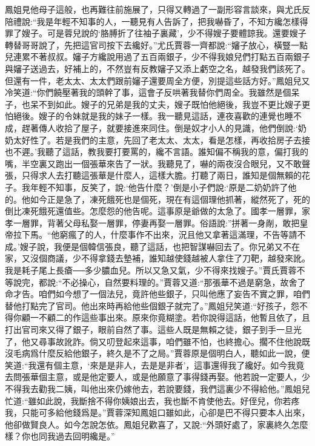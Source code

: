 \begin{parag}
    鳳姐見他母子這般，也再難往前施展了，只得又轉過了一副形容言談來，與尤氏反陪禮說:“我是年輕不知事的人，一聽見有人告訴了，把我嚇昏了，不知方纔怎樣得罪了嫂子。可是蓉兒說的‘胳膊折了往袖子裏藏’，少不得嫂子要體諒我。還要嫂子轉替哥哥說了，先把這官司按下去纔好。”尤氏賈蓉一齊都說:“嬸子放心，橫豎一點兒連累不著叔叔。嬸子方纔說用過了五百兩銀子，少不得我娘兒們打點五百兩銀子與嬸子送過去，好補上的，不然豈有反教嬸子又添上虧空之名，越發我們該死了。但還有一件，老太太、太太們跟前嬸子還要周全方便，別提這些話方好。”鳳姐兒又冷笑道:“你們饒壓著我的頭幹了事，這會子反哄著我替你們周全。我雖然是個呆子，也呆不到如此。嫂子的兄弟是我的丈夫，嫂子既怕他絕後，我豈不更比嫂子更怕絕後。嫂子的令妹就是我的妹子一樣。我一聽見這話，連夜喜歡的連覺也睡不成，趕著傳人收拾了屋子，就要接進來同住。倒是奴才小人的見識，他們倒說:‘奶奶太好性了。若是我們的主意，先回了老太太、太太，看是怎樣，再收拾房子去接也不遲。’我聽了這話，教我要打要罵的，纔不言語。誰知偏不稱我的意，偏打我的嘴，半空裏又跑出一個張華來告了一狀。我聽見了，嚇的兩夜沒合眼兒，又不敢聲張，只得求人去打聽這張華是什麼人，這樣大膽。打聽了兩日，誰知是個無賴的花子。我年輕不知事，反笑了，說:‘他告什麼？’倒是小子們說:‘原是二奶奶許了他的。他如今正是急了，凍死餓死也是個死，現在有這個理他抓著，縱然死了，死的倒比凍死餓死還值些。怎麼怨的他告呢。這事原是爺做的太急了。國孝一層罪，家孝一層罪，背著父母私娶一層罪，停妻再娶一層罪。俗語說:”拼著一身剮，敢把皇帝拉下馬。“他窮瘋了的人，什麼事作不出來，況且他又拿著這滿理，不告等請不成。’嫂子說，我便是個韓信張良，聽了這話，也把智謀嚇回去了。你兄弟又不在家，又沒個商議，少不得拿錢去墊補，誰知越使錢越被人拿住了刀靶，越發來訛。我是耗子尾上長瘡──多少膿血兒。所以又急又氣，少不得來找嫂子。”賈氏賈蓉不等說完，都說:“不必操心，自然要料理的。”賈蓉又道:“那張華不過是窮急，故舍了命才告。咱們如今想了一個法兒，竟許他些銀子，只叫他應了妄告不實之罪，咱們替他打點完了官司。他出來時再給他些個銀子就完了。”鳳姐兒笑道:“好孩子，怨不得你顧一不顧二的作這些事出來。原來你竟糊塗。若你說得這話，他暫且依了，且打出官司來又得了銀子，眼前自然了事。這些人既是無賴之徒，銀子到手一旦光了，他又尋事故訛詐。倘又叨登起來這事，咱們雖不怕，也終擔心。擱不住他說既沒毛病爲什麼反給他銀子，終久是不了之局。”賈蓉原是個明白人，聽如此一說，便笑道:“我還有個主意，‘來是是非人，去是是非者’，這事還得我了纔好。如今我竟去問張華個主意，或是他定要人，或是他願意了事得錢再娶。他若說一定要人，少不得我去勸我二姨，叫他出來仍嫁他去，若說要錢，我們這裏少不得給他。”鳳姐兒忙道:“雖如此說，我斷捨不得你姨娘出去，我也斷不肯使他去。好侄兒，你若疼我，只能可多給他錢爲是。”賈蓉深知鳳姐口雖如此，心卻是巴不得只要本人出來，他卻做賢良人。如今怎說怎依。鳳姐兒歡喜了，又說:“外頭好處了，家裏終久怎麼樣？你也同我過去回明纔是。” 
\end{parag}
